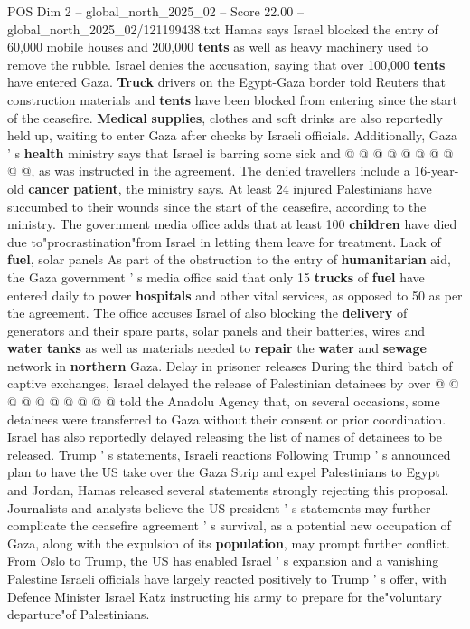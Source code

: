 \begin{textsample}{POS Dim 2 – global\_north\_2025\_02 – Score 22.00 – global\_north\_2025\_02/121199438.txt}
Hamas says Israel blocked the entry of 60,000 mobile houses and 200,000 \textbf{tents} as well as heavy machinery used to remove the rubble.
Israel denies the accusation, saying that over 100,000 \textbf{tents} have entered Gaza. \textbf{Truck} drivers on the Egypt-Gaza border told Reuters that construction materials and \textbf{tents} have been blocked from entering since the start of the ceasefire. \textbf{Medical} \textbf{supplies}, clothes and soft drinks are also reportedly held up, waiting to enter Gaza after checks by Israeli officials.
Additionally, Gaza ' s \textbf{health} ministry says that Israel is barring some sick and @ @ @ @ @ @ @ @ @ @, as was instructed in the agreement.
The denied travellers include a 16-year-old \textbf{cancer} \textbf{patient}, the ministry says.
At least 24 injured Palestinians have succumbed to their wounds since the start of the ceasefire, according to the ministry.
The government media office adds that at least 100 \textbf{children} have died due to"procrastination"from Israel in letting them leave for treatment.
Lack of \textbf{fuel}, solar panels As part of the obstruction to the entry of \textbf{humanitarian} aid, the Gaza government ' s media office said that only 15 \textbf{trucks} of \textbf{fuel} have entered daily to power \textbf{hospitals} and other vital services, as opposed to 50 as per the agreement.
The office accuses Israel of also blocking the \textbf{delivery} of generators and their spare parts, solar panels and their batteries, wires and \textbf{water} \textbf{tanks} as well as materials needed to \textbf{repair} the \textbf{water} and \textbf{sewage} network in \textbf{northern} Gaza.
Delay in prisoner releases During the third batch of captive exchanges, Israel delayed the release of Palestinian detainees by over @ @ @ @ @ @ @ @ @ @ told the Anadolu Agency that, on several occasions, some detainees were transferred to Gaza without their consent or prior coordination.
Israel has also reportedly delayed releasing the list of names of detainees to be released.
Trump ' s statements, Israeli reactions Following Trump ' s announced plan to have the US take over the Gaza Strip and expel Palestinians to Egypt and Jordan, Hamas released several statements strongly rejecting this proposal.
Journalists and analysts believe the US president ' s statements may further complicate the ceasefire agreement ' s survival, as a potential new occupation of Gaza, along with the expulsion of its \textbf{population}, may prompt further conflict.
From Oslo to Trump, the US has enabled Israel ' s expansion and a vanishing Palestine Israeli officials have largely reacted positively to Trump ' s offer, with Defence Minister Israel Katz instructing his army to prepare for the"voluntary departure"of Palestinians.

\end{textsample}
